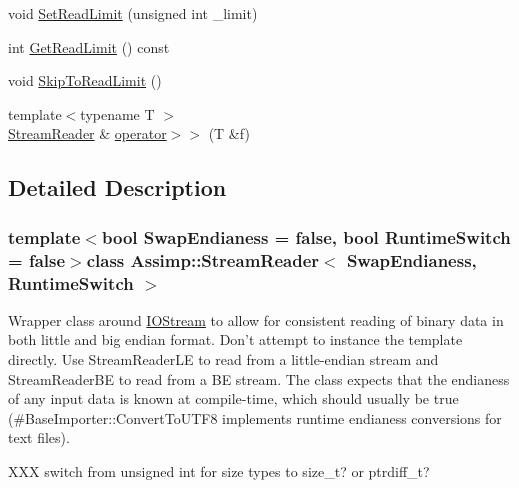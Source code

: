 \begin{DoxyCompactItemize}
\item 
void \hyperlink{singleton_assimp_1_1_stream_reader_a1cfe440624bd58b85d01d251c43dd91a}{Set\+Read\+Limit} (unsigned int \+\_\+limit)
\item 
int \hyperlink{singleton_assimp_1_1_stream_reader_a072e474b30f686fea0c62f49e466ccbc}{Get\+Read\+Limit} () const 
\item 
void \hyperlink{singleton_assimp_1_1_stream_reader_aa4117eb3976f7ffc49ee2d671d7eca25}{Skip\+To\+Read\+Limit} ()
\item 
{\footnotesize template$<$typename T $>$ }\\\hyperlink{singleton_assimp_1_1_stream_reader}{Stream\+Reader} \& \hyperlink{singleton_assimp_1_1_stream_reader_ade5d5559bd60ca0144d8b1f2bfd06918}{operator$>$$>$} (T \&f)
\end{DoxyCompactItemize}


\subsection{Detailed Description}
\subsubsection*{template$<$bool Swap\+Endianess = false, bool Runtime\+Switch = false$>$class Assimp\+::\+Stream\+Reader$<$ Swap\+Endianess, Runtime\+Switch $>$}

Wrapper class around \hyperlink{class_assimp_1_1_i_o_stream}{I\+O\+Stream} to allow for consistent reading of binary data in both little and big endian format. Don't attempt to instance the template directly. Use Stream\+Reader\+L\+E to read from a little-\/endian stream and Stream\+Reader\+B\+E to read from a B\+E stream. The class expects that the endianess of any input data is known at compile-\/time, which should usually be true (\#\+Base\+Importer\+::\+Convert\+To\+U\+T\+F8 implements runtime endianess conversions for text files).

X\+X\+X switch from unsigned int for size types to size\+\_\+t? or ptrdiff\+\_\+t? 

